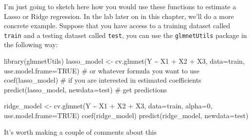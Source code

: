 \documentclass[
  letterpaper,
  DIV=11,
  numbers=noendperiod]{scrreprt}
\newenvironment{Shaded}{\begin{snugshade}}{\end{snugshade}}
\newcommand{\AttributeTok}[1]{\textcolor[rgb]{0.40,0.45,0.13}{#1}}
\newcommand{\CommentTok}[1]{\textcolor[rgb]{0.37,0.37,0.37}{#1}}
\newcommand{\ConstantTok}[1]{\textcolor[rgb]{0.56,0.35,0.01}{#1}}
\newcommand{\DecValTok}[1]{\textcolor[rgb]{0.68,0.00,0.00}{#1}}
\newcommand{\FunctionTok}[1]{\textcolor[rgb]{0.28,0.35,0.67}{#1}}
\newcommand{\NormalTok}[1]{\textcolor[rgb]{0.00,0.23,0.31}{#1}}
\newcommand{\OtherTok}[1]{\textcolor[rgb]{0.00,0.23,0.31}{#1}}
\newcommand{\SpecialCharTok}[1]{\textcolor[rgb]{0.37,0.37,0.37}{#1}}
\begin{document}
I'm just going to sketch here how you would use these functions to
estimate a Lasso or Ridge regression. In the lab later on in this
chapter, we'll do a more concrete example. Suppose that you have access
to a training dataset called \texttt{train} and a testing dataset called
\texttt{test}, you can use the \texttt{glmnetUtils} package in the
following way:

\begin{Shaded}
\begin{Highlighting}[]
\FunctionTok{library}\NormalTok{(glmnetUtils)}
\NormalTok{lasso\_model }\OtherTok{\textless{}{-}} \FunctionTok{cv.glmnet}\NormalTok{(Y }\SpecialCharTok{\textasciitilde{}}\NormalTok{ X1 }\SpecialCharTok{+}\NormalTok{ X2 }\SpecialCharTok{+}\NormalTok{ X3, }\AttributeTok{data=}\NormalTok{train, }\AttributeTok{use.model.frame=}\ConstantTok{TRUE}\NormalTok{) }\CommentTok{\# or whatever formula you want to use}
\FunctionTok{coef}\NormalTok{(lasso\_model) }\CommentTok{\# if you are interested in estimated coefficients}
\FunctionTok{predict}\NormalTok{(lasso\_model, }\AttributeTok{newdata=}\NormalTok{test) }\CommentTok{\# get predictions}

\NormalTok{ridge\_model }\OtherTok{\textless{}{-}} \FunctionTok{cv.glmnet}\NormalTok{(Y }\SpecialCharTok{\textasciitilde{}}\NormalTok{ X1 }\SpecialCharTok{+}\NormalTok{ X2 }\SpecialCharTok{+}\NormalTok{ X3, }
                         \AttributeTok{data=}\NormalTok{train, }
                         \AttributeTok{alpha=}\DecValTok{0}\NormalTok{,}
                         \AttributeTok{use.model.frame=}\ConstantTok{TRUE}\NormalTok{)}
\FunctionTok{coef}\NormalTok{(ridge\_model)}
\FunctionTok{predict}\NormalTok{(ridge\_model, }\AttributeTok{newdata=}\NormalTok{test)}
\end{Highlighting}
\end{Shaded}

It's worth making a couple of comments about this
\end{document}
